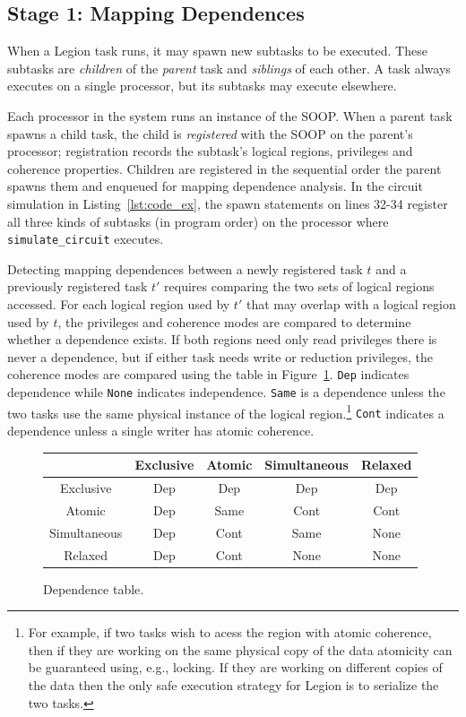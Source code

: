 \subsection{Stage 1: Mapping Dependences}
\label{sec:dep}


When a Legion task runs, it may spawn new subtasks to be executed.  
These subtasks are {\em children} of the {\em parent} task and {\em siblings} of each other.  
A task always executes on a single processor, but
its subtasks may execute elsewhere.

Each processor in the system runs an instance of the SOOP.
When a parent task spawns a child task, the child is {\em registered}
with the SOOP on the parent's processor;
registration records the subtask's logical regions,
privileges and coherence properties.  Children are
registered in the sequential order the parent
spawns them and enqueued for mapping dependence analysis.  In the
circuit simulation in Listing~\ref{lst:code_ex}, the spawn
statements on lines 32-34 register all three
kinds of subtasks (in program order) on the processor where {\tt
simulate\_circuit} executes.

Detecting mapping dependences between a newly registered task $t$ and
a previously registered task $t'$ requires comparing the two sets of
logical regions accessed.  For each logical region used by $t'$ that
may overlap with a logical region used by $t$, the privileges and
coherence modes are compared to determine whether a dependence exists.
If both regions need only read privileges there is never a dependence,
but if either task needs write or reduction privileges, the coherence
modes are compared using the table in Figure~\ref{fig:dependence}.
{\tt Dep} indicates dependence while {\tt None}
indicates independence.  {\tt Same} is a dependence unless the two tasks
use the same physical instance of the logical region.\footnote{For example, if two tasks wish to acess the region with atomic coherence, then if they are working on the same physical copy of the data atomicity can be guaranteed using, e.g., locking.  If they are working on different copies of the data then the only safe execution strategy for Legion is to serialize the two tasks.}
{\tt Cont} 
indicates a dependence unless a single writer has
atomic coherence.  


\begin{figure}
{\small
\begin{tabular}{c|cccc}
             & Exclusive & Atomic   & Simultaneous & Relaxed \\
\midrule
Exclusive    & Dep & Dep & Dep & Dep \\ 
Atomic       & Dep & Same & Cont & Cont \\
Simultaneous & Dep & Cont & Same & None \\
Relaxed      & Dep & Cont & None & None \\
\end{tabular}
}
\caption{Dependence table.}
\label{fig:dependence}
\end{figure}

